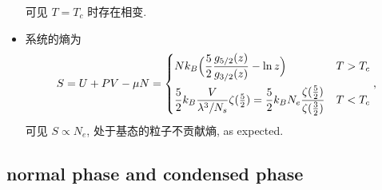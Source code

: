 \begin{itemize}
	可见 $T = T_c$ 时存在相变.
	
	\item 系统的熵为
	\begin{equation} \label{7.1.11}
		S = U + P V - \mu N = \begin{dcases}
			N k_B \Big( \frac{5}{2} \frac{g_{5 / 2}(z)}{g_{3 / 2}(z)} - \ln z \Big) & T > T_c \\
			\frac{5}{2} k_B \frac{V}{\lambda^3 / N_s} \zeta({\textstyle \frac{5}{2}}) = \frac{5}{2} k_B N_e \frac{\zeta(\frac{5}{2})}{\zeta(\frac{3}{2})} & T < T_c
		\end{dcases},
	\end{equation}
	可见 $S \propto N_e$, 处于基态的粒子不贡献熵, as expected.
\end{itemize}

\subsection{normal phase and condensed phase}

